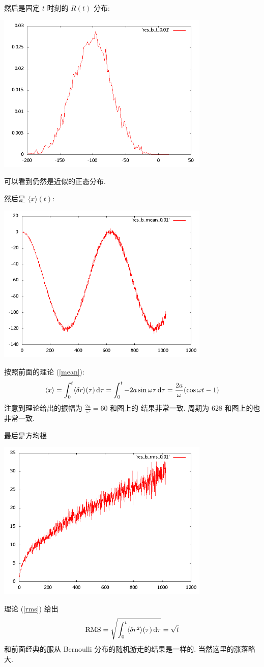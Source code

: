 \documentclass{ctexart}
\def\dd{{\rm d}}
\begin{document}
然后是固定 $t$ 时刻的 $R(t)$ 分布:
\begin{center}
\includegraphics[width=4in]{plot_b_f_0.01.png}
\end{center}
可以看到仍然是近似的正态分布.

然后是 $\langle x\rangle(t)$:
\begin{center}
\includegraphics[width=4in]{plot_b_mean_0.01.png}
\end{center}
按照前面的理论 (\ref{mean}):
\[
\langle x\rangle = \int^t_0 \langle\delta r\rangle
(\tau)\,\dd\tau = \int^t_0 -2a\sin \omega\tau\,\dd\tau
=\frac{2a}{\omega}(\cos\omega t-1)
\]
注意到理论给出的振幅为 $\frac{2a}{\omega} = 60$ 和图上的
结果非常一致. 周期为 628 和图上的也非常一致.

最后是方均根
\begin{center}
\includegraphics[width=4in]{plot_b_rms_0.01.png}
\end{center}
理论 (\ref{rms}) 给出
\[
{\rm RMS} = \sqrt{\int^t_0 \langle\delta r^2\rangle
(\tau)\,\dd\tau} = \sqrt{t}
\]
和前面经典的服从 Bernoulli 分布的随机游走的结果是一样的.
当然这里的涨落略大.
\end{document}

